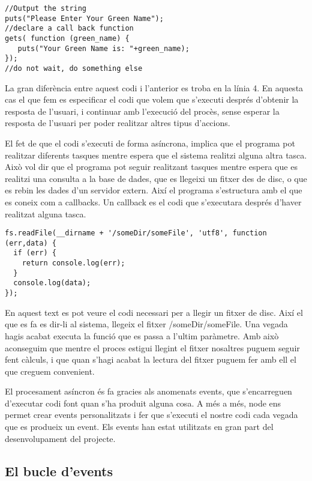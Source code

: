 \begin{lstlisting}
//Output the string
puts("Please Enter Your Green Name");
//declare a call back function
gets( function (green_name) {
   puts("Your Green Name is: "+green_name);
});
//do not wait, do something else
\end{lstlisting}

La gran diferència entre aquest codi i l'anterior es troba en la línia 4. En aquesta cas el que fem es especificar el codi que volem que s'executi després d'obtenir la resposta de l'usuari, i continuar amb l'execució del procès, sense esperar la resposta de l'usuari per poder realitzar altres tipus d'accions. 

El fet de que el codi s'executi de forma asíncrona, implica que el programa pot realitzar diferents tasques mentre espera que el sistema realitzi alguna altra tasca. Això vol dir que el programa pot seguir realitzant tasques mentre espera que es realitzi una consulta a la base de dades, que es llegeixi un fitxer des de disc, o que es rebin les dades d'un servidor extern. Així el programa s'estructura amb el que es coneix com a callbacks. Un callback es el codi que s'executara després d'haver realitzat alguna tasca. 

\begin{lstlisting}
fs.readFile(__dirname + '/someDir/someFile', 'utf8', function (err,data) {
  if (err) {
    return console.log(err);
  }
  console.log(data);
});
\end{lstlisting}

En aquest text es pot veure el codi necessari per a llegir un fitxer de disc. Així el que es fa es dir-li al sistema, llegeix el fitxer /someDir/someFile. Una vegada hagis acabat executa la funció que es passa a l'ultim paràmetre. Amb això aconseguim que mentre el proces estigui llegint el fitxer nosaltres puguem seguir fent càlculs, i que quan s'hagi acabat la lectura del fitxer puguem fer amb ell el que creguem convenient. 

El procesament asíncron és fa gracies als anomenats events, que s'encarreguen d'executar codi font quan s'ha produit alguna cosa. A més a més, node ens permet crear events personalitzats i fer que s'executi el nostre codi cada vegada que es produeix un event. Els events han estat utilitzats en gran part del desenvolupament del projecte. 

\subsection{El bucle d'events}

